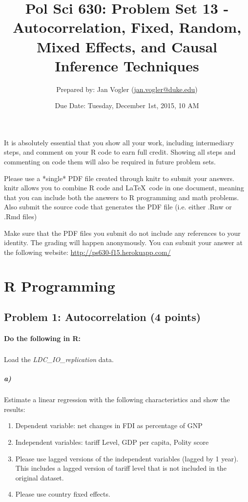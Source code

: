 \documentclass[12pt]{article}
\begin{document}
\title{Pol Sci 630: Problem Set 13 - Autocorrelation, Fixed, Random, Mixed Effects, and Causal Inference Techniques}

\author{Prepared by: Jan Vogler (\href{mailto:jan.vogler@duke.edu}{jan.vogler@duke.edu})}

\date{Due Date: Tuesday, December 1st, 2015, 10 AM}
 
\maketitle 



It is absolutely essential that you show all your work, including intermediary steps, and comment on your R code to earn full credit. Showing all steps and commenting on code them will also be required in future problem sets.

Please use a *single* PDF file created through knitr to submit your answers. knitr allows you to combine R code and \LaTeX \ code in one document, meaning that you can include both the answers to R programming and math problems. Also submit the source code that generates the PDF file (i.e. either .Rnw or .Rmd files)

Make sure that the PDF files you submit do not include any references to your identity. The grading will happen anonymously. You can submit your answer at the following website: \url{http://ps630-f15.herokuapp.com/}



\section*{R Programming}

\subsection*{Problem 1: Autocorrelation (4 points)}

\paragraph{Do the following in R:}

\subparagraph{} Load the \textit{LDC\_IO\_replication} data.

\subparagraph{a)} Estimate a linear regression with the following characteristics and show the results:

\begin{enumerate}
	\item Dependent variable: net changes in FDI as percentage of GNP
	\item Independent variables: tariff Level, GDP per capita, Polity score
	\item Please use lagged versions of the independent variables (lagged by 1 year). This includes a lagged version of tariff level that is not included in the original dataset.
	\item Please use country fixed effects.
\end{enumerate}
\end{document}

